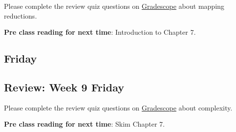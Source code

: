 Please complete the review quiz questions on \href{http://gradescope.com}{Gradescope} about 
mapping reductions.

{\bf Pre class reading for next time}: Introduction to Chapter 7.



\newpage
\subsection*{Friday}



\newpage
\subsection*{Review: Week 9 Friday}


Please complete the review quiz questions on \href{http://gradescope.com}{Gradescope} about 
complexity.

{\bf Pre class reading for next time}: Skim Chapter 7.

\newpage
